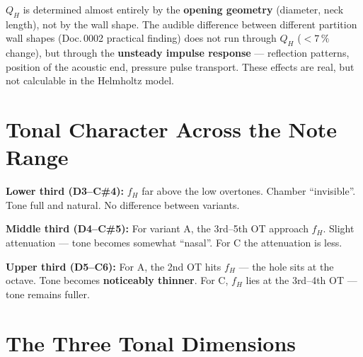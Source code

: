 \documentclass[11pt,a4paper]{article}
\begin{document}
\begin{keybox}
$Q_H$ is determined almost entirely by the \textbf{opening geometry} (diameter, neck length), not by the wall shape. The audible difference between different partition wall shapes (Doc.\,0002 practical finding) does not run through $Q_H$ ($< 7\,\%$ change), but through the \textbf{unsteady impulse response} --- reflection patterns, position of the acoustic end, pressure pulse transport. These effects are real, but not calculable in the Helmholtz model.
\end{keybox}


\section{Tonal Character Across the Note Range}

\textbf{Lower third (D3--C\#4):} $f_H$ far above the low overtones. Chamber ``invisible''. Tone full and natural. No difference between variants.

\textbf{Middle third (D4--C\#5):} For variant A, the 3rd--5th OT approach $f_H$. Slight attenuation --- tone becomes somewhat ``nasal''. For C the attenuation is less.

\textbf{Upper third (D5--C6):} For A, the 2nd OT hits $f_H$ --- the hole sits at the octave. Tone becomes \textbf{noticeably thinner}. For C, $f_H$ lies at the 3rd--4th OT --- tone remains fuller.


\section{The Three Tonal Dimensions}

\begin{table}[H]
\centering\footnotesize
{}
\caption{The three tonal dimensions. Position is the dominant lever.}
\end{table}
\end{document}
